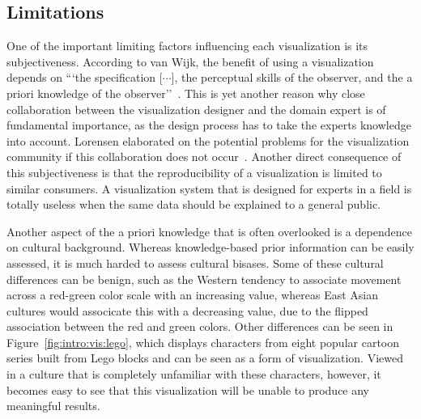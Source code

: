 \subsection{Limitations} \label{cha:intro:vis:limitations}
One of the important limiting factors influencing each visualization is its subjectiveness.  According to van Wijk, the benefit of using a visualization depends on ```the specification [$\cdots$], the perceptual skills of the observer, and the a priori knowledge of the observer''~\cite{van2005value}.  This is yet another reason why close collaboration between the visualization designer and the domain expert is of fundamental importance, as the design process has to take the experts knowledge into account.  Lorensen elaborated on the potential problems for the visualization community if this collaboration does not occur~\cite{lorensen2004death}.  Another direct consequence of this subjectiveness is that the reproducibility of a visualization is limited to similar consumers.  A visualization system that is designed for experts in a field is totally useless when the same data should be explained to a general public.  

Another aspect of the a priori knowledge that is often overlooked is a dependence on cultural background.  Whereas knowledge-based prior information can be easily assessed, it is much harded to assess cultural bisases.  Some of these cultural differences can be benign, such as the Western tendency to associate movement across a red-green color scale with an increasing value, whereas East Asian cultures would associcate this with a decreasing value, due to the flipped association between the red and green colors.  Other differences can be seen in Figure~\ref{fig:intro:vis:lego}, which displays characters from eight popular cartoon series built from Lego blocks and can be seen as a form of visualization.  Viewed in a culture that is completely unfamiliar with these characters, however, it becomes easy to see that this visualization will be unable to produce any meaningful results.

